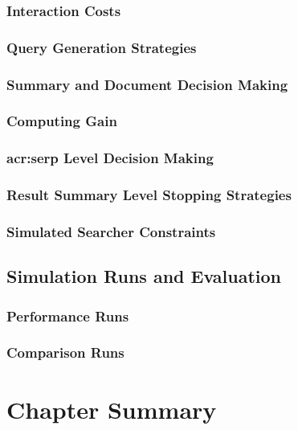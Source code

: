 \subsubsection{Interaction Costs}

\subsubsection{Query Generation Strategies}

\subsubsection{Summary and Document Decision Making}

\subsubsection{Computing Gain}

\subsubsection{\gls{acr:serp} Level Decision Making}

\subsubsection{Result Summary Level Stopping Strategies}

\subsubsection{Simulated Searcher Constraints}

\subsection{Simulation Runs and Evaluation}

\subsubsection{Performance Runs}

\subsubsection{Comparison Runs}

\section{Chapter Summary}